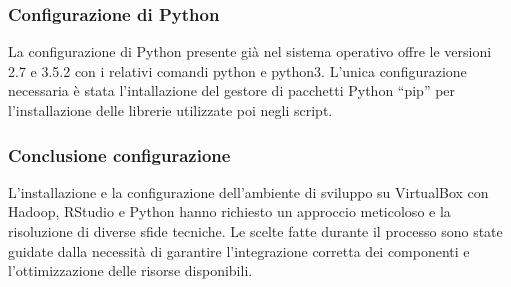 \subsubsection{Configurazione di Python}
La configurazione di Python presente già nel sistema operativo offre le versioni 2.7 e 3.5.2 con i relativi comandi python e python3. L’unica configurazione necessaria è stata l’intallazione del gestore di pacchetti Python “pip” per l’installazione delle librerie utilizzate poi negli script.
\subsubsection{Conclusione configurazione}
L'installazione e la configurazione dell'ambiente di sviluppo su VirtualBox con Hadoop, RStudio e Python hanno richiesto un approccio meticoloso e la risoluzione di diverse sfide tecniche. Le scelte fatte durante il processo sono state guidate dalla necessità di garantire l'integrazione corretta dei componenti e l'ottimizzazione delle risorse disponibili.


